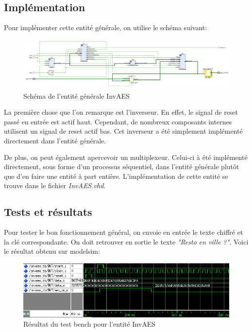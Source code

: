 \documentclass[a4paper, 12pt]{article}
\begin{document}
	\subsection{Implémentation}
	Pour implémenter cette entité générale, on utilise le schéma suivant:
			\begin{figure}[H]
				\begin{center}
				\includegraphics[scale=0.3]{Images/InvAESEntity.png}
				\end{center}
				\caption{Schéma de l'entité générale InvAES}
				\label{InvAESRoundEntity}
			\end{figure}
La première chose que l'on remarque est l'inverseur. En effet, le signal de reset passé en entrée est actif haut. Cependant, de nombreux composants internes utilisent un signal de reset actif bas. Cet inverseur a été simplement implémenté directement dans l'entité générale.

De plus, on peut également apercevoir un multiplexeur. Celui-ci à été implémenté directement, sous forme d'un processus séquentiel, dans l'entité générale plutôt que d'en faire une entité à part entière.
	L'implémentation de cette entité se trouve dans le fichier \emph{InvAES.vhd}.
	
	\subsection{Tests et résultats}
Pour tester le bon fonctionnement général, on envoie en entrée le texte chiffré et la clé correspondante. On doit retrouver en sortie le texte \emph{"Resto en ville ?"}. Voici le résultat obtenu sur modelsim:
			\begin{figure}[H]
				\begin{center}
				\includegraphics[scale=0.68]{Images/InvAESTb1.png}
				\end{center}
				\caption{Résultat du test bench pour l'entité InvAES}
				\label{InvAESRoundTb1}
			\end{figure}
			
\end{document}
